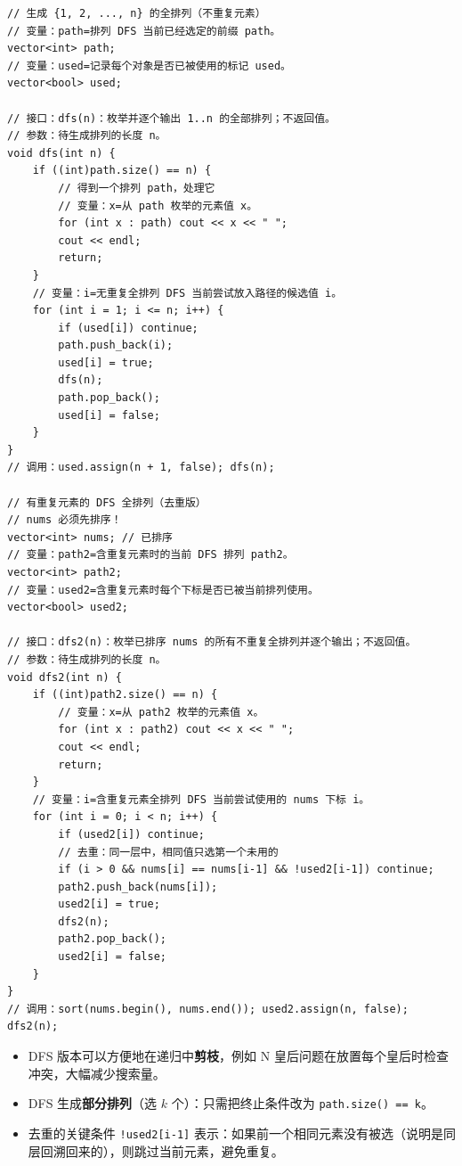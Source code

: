 \documentclass[UTF8,openany,oneside,zihao=-4]{ctexbook}
\begin{document}
\begin{lstlisting}
// 生成 {1, 2, ..., n} 的全排列（不重复元素）
// 变量：path=排列 DFS 当前已经选定的前缀 path。
vector<int> path;
// 变量：used=记录每个对象是否已被使用的标记 used。
vector<bool> used;

// 接口：dfs(n)：枚举并逐个输出 1..n 的全部排列；不返回值。
// 参数：待生成排列的长度 n。
void dfs(int n) {
    if ((int)path.size() == n) {
        // 得到一个排列 path，处理它
        // 变量：x=从 path 枚举的元素值 x。
        for (int x : path) cout << x << " ";
        cout << endl;
        return;
    }
    // 变量：i=无重复全排列 DFS 当前尝试放入路径的候选值 i。
    for (int i = 1; i <= n; i++) {
        if (used[i]) continue;
        path.push_back(i);
        used[i] = true;
        dfs(n);
        path.pop_back();
        used[i] = false;
    }
}
// 调用：used.assign(n + 1, false); dfs(n);

// 有重复元素的 DFS 全排列（去重版）
// nums 必须先排序！
vector<int> nums; // 已排序
// 变量：path2=含重复元素时的当前 DFS 排列 path2。
vector<int> path2;
// 变量：used2=含重复元素时每个下标是否已被当前排列使用。
vector<bool> used2;

// 接口：dfs2(n)：枚举已排序 nums 的所有不重复全排列并逐个输出；不返回值。
// 参数：待生成排列的长度 n。
void dfs2(int n) {
    if ((int)path2.size() == n) {
        // 变量：x=从 path2 枚举的元素值 x。
        for (int x : path2) cout << x << " ";
        cout << endl;
        return;
    }
    // 变量：i=含重复元素全排列 DFS 当前尝试使用的 nums 下标 i。
    for (int i = 0; i < n; i++) {
        if (used2[i]) continue;
        // 去重：同一层中，相同值只选第一个未用的
        if (i > 0 && nums[i] == nums[i-1] && !used2[i-1]) continue;
        path2.push_back(nums[i]);
        used2[i] = true;
        dfs2(n);
        path2.pop_back();
        used2[i] = false;
    }
}
// 调用：sort(nums.begin(), nums.end()); used2.assign(n, false); dfs2(n);
\end{lstlisting}

\begin{tip}
\begin{itemize}
  \item DFS 版本可以方便地在递归中\textbf{剪枝}，例如 N 皇后问题在放置每个皇后时检查冲突，大幅减少搜索量。
  \item DFS 生成\textbf{部分排列}（选 $k$ 个）：只需把终止条件改为 \lstinline|path.size() == k|。
  \item 去重的关键条件 \lstinline|!used2[i-1]| 表示：如果前一个相同元素没有被选（说明是同层回溯回来的），则跳过当前元素，避免重复。
\end{itemize}
\end{tip}
\end{document}
